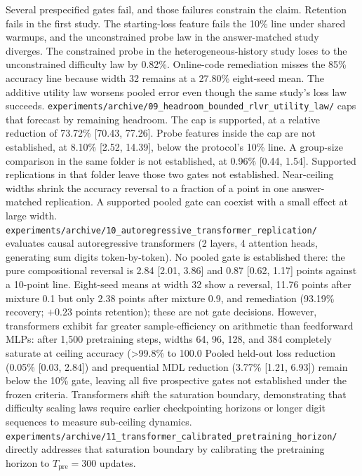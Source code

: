 Several prespecified gates fail, and those failures constrain the claim.
Retention fails in the first study.
The starting-loss feature fails the 10\% line under shared warmups, and the unconstrained probe law in the answer-matched study diverges.
The constrained probe in the heterogeneous-history study loses to the unconstrained difficulty law by 0.82\%.
Online-code remediation misses the 85\% accuracy line because width 32 remains at a 27.80\% eight-seed mean.
The additive utility law worsens pooled error even though the same study's loss law succeeds.
\texttt{experiments/archive/09\_headroom\_bounded\_rlvr\_utility\_law/} caps that forecast by remaining headroom.
The cap is supported, at a relative reduction of 73.72\% [70.43, 77.26].
Probe features inside the cap are not established, at 8.10\% [2.52, 14.39], below the protocol's 10\% line.
A group-size comparison in the same folder is not established, at 0.96\% [0.44, 1.54].
Supported replications in that folder leave those two gates not established.
Near-ceiling widths shrink the accuracy reversal to a fraction of a point in one answer-matched replication.
A supported pooled gate can coexist with a small effect at large width.
\texttt{experiments/archive/10\_autoregressive\_transformer\_replication/} evaluates causal autoregressive transformers (2 layers, 4 attention heads, generating sum digits token-by-token).
No pooled gate is established there: the pure compositional reversal is 2.84 [2.01, 3.86] and 0.87 [0.62, 1.17] points against a 10-point line.
Eight-seed means at width 32 show a reversal, 11.76 points after mixture 0.1 but only 2.38 points after mixture 0.9, and remediation (93.19\% recovery; $+0.23$ points retention); these are not gate decisions.
However, transformers exhibit far greater sample-efficiency on arithmetic than feedforward MLPs: after 1,500 pretraining steps, widths 64, 96, 128, and 384 completely saturate at ceiling accuracy (>99.8\% to 100.0%
Pooled held-out loss reduction (0.05\% [0.03, 2.84]) and prequential MDL reduction (3.77\% [1.21, 6.93]) remain below the 10\% gate, leaving all five prospective gates not established under the frozen criteria.
Transformers shift the saturation boundary, demonstrating that difficulty scaling laws require earlier checkpointing horizons or longer digit sequences to measure sub-ceiling dynamics.
\texttt{experiments/archive/11\_transformer\_calibrated\_pretraining\_horizon/} directly addresses that saturation boundary by calibrating the pretraining horizon to $T_{\text{pre}}=300$ updates.
